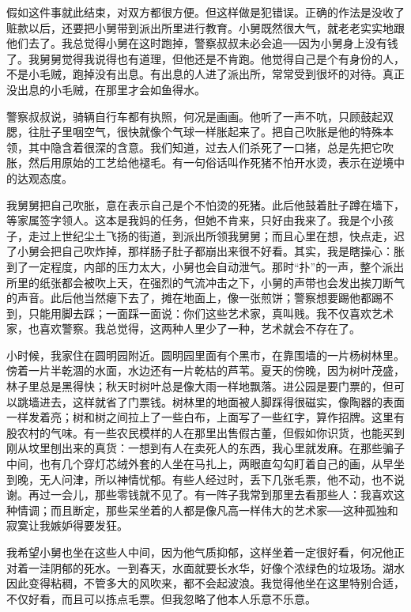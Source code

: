 假如这件事就此结束，对双方都很方便。但这样做是犯错误。正确的作法是没收了赃款以后，还要把小舅带到派出所里进行教育。小舅既然很大气，就老老实实地跟他们去了。我总觉得小舅在这时跑掉，警察叔叔未必会追──因为小舅身上没有钱了。我舅舅觉得我说得也有道理，但他还是不肯跑。他觉得自己是个有身份的人，不是小毛贼，跑掉没有出息。有出息的人进了派出所，常常受到很坏的对待。真正没出息的小毛贼，在那里才会如鱼得水。 

警察叔叔说，骑辆自行车都有执照，何况是画画。他听了一声不吭，只顾鼓起双腮，往肚子里咽空气，很快就像个气球一样胀起来了。把自己吹胀是他的特殊本领，其中隐含着很深的含意。我们知道，过去人们杀死了一口猪，总是先把它吹胀，然后用原始的工艺给他褪毛。有一句俗话叫作死猪不怕开水烫，表示在逆境中的达观态度。 

我舅舅把自己吹胀，意在表示自己是个不怕烫的死猪。此后他鼓着肚子蹲在墙下，等家属签字领人。这本是我妈的任务，但她不肯来，只好由我来了。我是个小孩子，走过上世纪尘土飞扬的街道，到派出所领我舅舅；而且心里在想，快点走，迟了小舅会把自己吹炸掉，那样肠子肚子都崩出来很不好看。其实，我是瞎操心：胀到了一定程度，内部的压力太大，小舅也会自动泄气。那时“扑”的一声，整个派出所里的纸张都会被吹上天，在强烈的气流冲击之下，小舅的声带也会发出挨刀断气的声音。此后他当然瘪下去了，摊在地面上，像一张煎饼；警察想要踢他都踢不到，只能用脚去踩；一面踩一面说：你们这些艺术家，真叫贱。我不仅喜欢艺术家，也喜欢警察。我总觉得，这两种人里少了一种，艺术就会不存在了。 

小时候，我家住在圆明园附近。圆明园里面有个黑市，在靠围墙的一片杨树林里。傍着一片半乾涸的水面，水边还有一片乾枯的芦苇。夏天的傍晚，因为树叶茂盛，林子里总是黑得快；秋天时树叶总是像大雨一样地飘落。进公园是要门票的，但可以跳墙进去，这样就省了门票钱。树林里的地面被人脚踩得很磁实，像陶器的表面一样发着亮；树和树之间拉上了一些白布，上面写了一些红字，算作招牌。这里有股农村的气味。有一些农民模样的人在那里出售假古董，但假如你识货，也能买到刚从坟里刨出来的真货：一想到有人在卖死人的东西，我心里就发麻。在那些骗子中间，也有几个穿灯芯绒外套的人坐在马扎上，两眼直勾勾盯着自己的画，从早坐到晚，无人问津，所以神情忧郁。有些人经过时，丢下几张毛票，他不动，也不说谢。再过一会儿，那些零钱就不见了。有一阵子我常到那里去看那些人：我喜欢这种情调；而且断定，那些呆坐着的人都是像凡高一样伟大的艺术家──这种孤独和寂寞让我嫉妒得要发狂。 

我希望小舅也坐在这些人中间，因为他气质抑郁，这样坐着一定很好看，何况他正对着一洼阴郁的死水。一到春天，水面就要长水华，好像个浓绿色的垃圾场。湖水因此变得粘稠，不管多大的风吹来，都不会起波浪。我觉得他坐在这里特别合适，不仅好看，而且可以拣点毛票。但我忽略了他本人乐意不乐意。 

